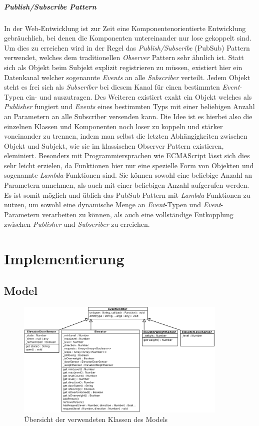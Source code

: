 \paragraph{Publish/Subscribe Pattern}
In der Web-Entwicklung ist zur Zeit eine Komponentenorientierte Entwicklung gebräuchlich, bei denen die Komponenten untereinander nur lose gekoppelt sind.
Um dies zu erreichen wird in der Regel das \textit{Publish/Subscribe} (PubSub) Pattern verwendet, welches dem traditionellen \textit{Observer} Pattern sehr ähnlich ist.
Statt sich als Objekt beim Subjekt explizit registrieren zu müssen, existiert hier ein Datenkanal welcher sogenannte \textit{Events} an alle \textit{Subscriber} verteilt.
Jedem Objekt steht es frei sich als \textit{Subscriber} bei diesem Kanal für einen bestimmten \textit{Event}-Typen ein- und auszutragen.
Des Weiteren existiert exakt ein Objekt welches als \textit{Publisher} fungiert und \textit{Events} eines bestimmten Typs mit einer beliebigen Anzahl an Parametern an alle Subscriber versenden kann.
Die Idee ist es hierbei also die einzelnen Klassen und Komponenten noch loser zu koppeln und stärker voneinander zu trennen, indem man selbst die letzten Abhängigkeiten zwischen Objekt und Subjekt, wie sie im klassischen Observer Pattern existieren, eleminiert.
Besonders mit Programmiersprachen wie ECMAScript lässt sich dies sehr leicht erzielen, da Funktionen hier nur eine spezielle Form von Objekten und sogenannte \textit{Lambda}-Funktionen sind.
Sie können sowohl eine beliebige Anzahl an Parametern annehmen, als auch mit einer beliebigen Anzahl aufgerufen werden.
Es ist somit möglich und üblich das PubSub Pattern mit \textit{Lambda}-Funktionen zu nutzen, um sowohl eine dynamische Menge an \textit{Event}-Typen und \textit{Event}-Parametern verarbeiten zu können, als auch eine vollständige Entkopplung zwischen \textit{Publisher} und \textit{Subscriber} zu erreichen.

\chapter{Implementierung}
\label{imp}

\section{Model}
\label{imp_model}

\begin{figure}[h!]
	\centering
	\includegraphics[width=0.9\textwidth]{images/klassendiagramm.eps}
	\caption{Übersicht der verwendeten Klassen des Models}
	\label{klassendiagramm}
\end{figure}


